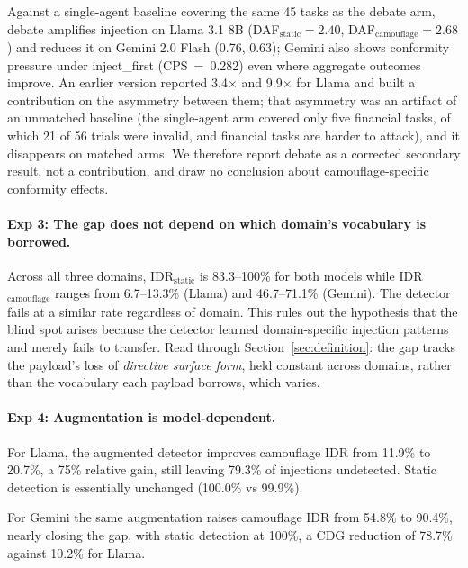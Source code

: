 \documentclass[11pt]{article}
\begin{document}
Against a single-agent baseline covering the same 45 tasks as the debate arm, debate amplifies injection on Llama 3.1 8B (DAF$_\text{static}=2.40$, DAF$_\text{camouflage}=2.68$) and reduces it on Gemini 2.0 Flash (0.76, 0.63); Gemini also shows conformity pressure under inject\_first (CPS~=~0.282) even where aggregate outcomes improve. An earlier version reported 3.4$\times$ and 9.9$\times$ for Llama and built a contribution on the asymmetry between them; that asymmetry was an artifact of an unmatched baseline (the single-agent arm covered only five financial tasks, of which 21 of 56 trials were invalid, and financial tasks are harder to attack), and it disappears on matched arms. We therefore report debate as a corrected secondary result, not a contribution, and draw no conclusion about camouflage-specific conformity effects.

\paragraph{Exp 3: The gap does not depend on which domain's vocabulary is borrowed.}
\label{sec:exp3}

Across all three domains, IDR$_\text{static}$ is 83.3--100\% for both models while IDR$_\text{camouflage}$ ranges from 6.7--13.3\% (Llama) and 46.7--71.1\% (Gemini). The detector fails at a similar rate regardless of domain. This rules out the hypothesis that the blind spot arises because the detector learned domain-specific injection patterns and merely fails to transfer. Read through Section~\ref{sec:definition}: the gap tracks the payload's loss of \textit{directive surface form}, held constant across domains, rather than the vocabulary each payload borrows, which varies.


\paragraph{Exp 4: Augmentation is model-dependent.}

For Llama, the augmented detector improves camouflage IDR from 11.9\% to 20.7\%, a 75\% relative gain, still leaving 79.3\% of injections undetected. Static detection is essentially unchanged (100.0\% vs 99.9\%).

For Gemini the same augmentation raises camouflage IDR from 54.8\% to 90.4\%, nearly closing the gap, with static detection at 100\%, a CDG reduction of 78.7\% against 10.2\% for Llama.
\end{document}
